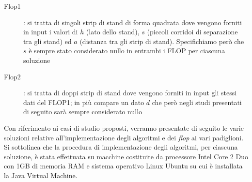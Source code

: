 \documentclass[12pt,a4paper,openright,twoside]{report}
\begin{document}
\begin{description}
\item[Flop1]: si tratta di singoli strip di stand di forma quadrata dove vengono forniti in input i valori di $h$ (lato dello stand), $s$ (piccoli corridoi di separazione tra gli stand) ed $a$ (distanza tra gli strip di stand). Specifichiamo per\`{o} che $s$ \`{e} sempre stato considerato nullo in entrambi i FLOP per ciascuna soluzione
\item[Flop2]: si tratta di doppi strip di stand dove vengono forniti in input gli stessi dati del FLOP1; in pi\`{u} compare un dato $d$ che per\`{o} negli studi presentati di seguito sar\`{a} sempre considerato nullo
\end{description}
Con riferimento ai casi di studio proposti, verranno presentate di seguito le varie soluzioni relative all'implementazione degli algoritmi e dei \textit{flop} ai vari padiglioni. \\Si sottolinea che la procedura di implementazione degli algoritmi, per ciascuna soluzione, \`{e} stata effettuata su macchine costituite da processore Intel Core 2 Duo con 1GB di memoria RAM e sistema operativo Linux Ubuntu su cui \`{e} installata la Java Virtual Machine.  
\end{document}

